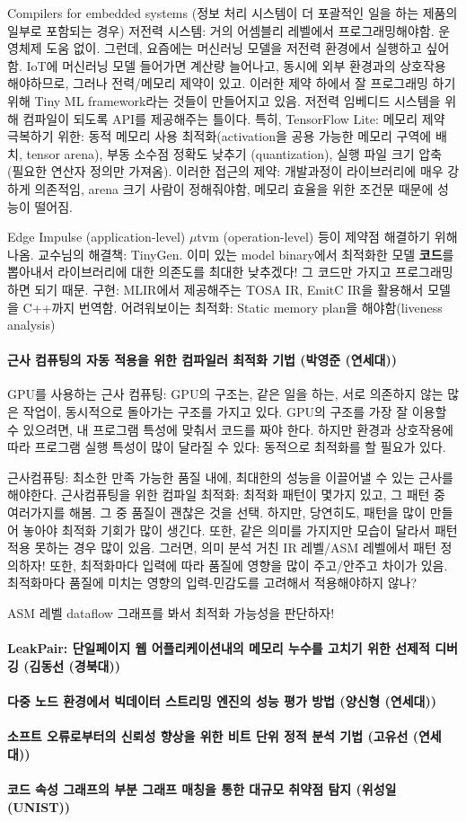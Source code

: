 \documentclass{article}
\begin{document}
Compilers for embedded systems (정보 처리 시스템이 더 포괄적인 일을 하는 제품의 일부로 포함되는 경우)
저전력 시스템: 거의 어셈블리 레벨에서 프로그래밍해야함. 운영체제 도움 없이.
그런데, 요즘에는 머신러닝 모델을 저전력 환경에서 실행하고 싶어함.
IoT에 머신러닝 모델 들어가면 계산량 늘어나고, 동시에 외부 환경과의 상호작용 해야하므로, 그러나 전력/메모리 제약이 있고.
이러한 제약 하에서 잘 프로그래밍 하기 위해 Tiny ML framework라는 것들이 만들어지고 있음.
저전력 임베디드 시스템을 위해 컴파일이 되도록 API를 제공해주는 틀이다.
특히, TensorFlow Lite: 메모리 제약 극복하기 위한: 동적 메모리 사용 최적화(activation을 공용 가능한 메모리 구역에 배치, tensor arena), 부동 소수점 정확도 낮추기 (quantization), 실행 파일 크기 압축 (필요한 연산자 정의만 가져옴).
이러한 접근의 제약: 개발과정이 라이브러리에 매우 강하게 의존적임, arena 크기 사람이 정해줘야함, 메모리 효율을 위한 조건문 때문에 성능이 떨어짐.

Edge Impulse (application-level) $\mu$tvm (operation-level) 등이 제약점 해결하기 위해 나옴.
교수님의 해결책: TinyGen. 이미 있는 model binary에서 최적화한 모델 \textbf{코드}를 뽑아내서 라이브러리에 대한 의존도를 최대한 낮추겠다!
그 코드만 가지고 프로그래밍하면 되기 때문.
구현: MLIR에서 제공해주는 TOSA IR, EmitC IR을 활용해서 모델을 C++까지 번역함.
어려워보이는 최적화: Static memory plan을 해야함(liveness analysis)
\paragraph{근사 컴퓨팅의 자동 적용을 위한 컴파일러 최적화 기법 (박영준 (연세대))}
GPU를 사용하는 근사 컴퓨팅: GPU의 구조는, 같은 일을 하는, 서로 의존하지 않는 많은 작업이, 동시적으로 돌아가는 구조를 가지고 있다.
GPU의 구조를 가장 잘 이용할 수 있으려면, 내 프로그램 특성에 맞춰서 코드를 짜야 한다.
하지만 환경과 상호작용에 따라 프로그램 실행 특성이 많이 달라질 수 있다: 동적으로 최적화를 할 필요가 있다.

근사컴퓨팅: 최소한 만족 가능한 품질 내에, 최대한의 성능을 이끌어낼 수 있는 근사를 해야한다.
근사컴퓨팅을 위한 컴파일 최적화: 최적화 패턴이 몇가지 있고, 그 패턴 중 여러가지를 해봄. 그 중 품질이 괜찮은 것을 선택.
하지만, 당연히도, 패턴을 많이 만들어 놓아야 최적화 기회가 많이 생긴다.
또한, 같은 의미를 가지지만 모습이 달라서 패턴 적용 못하는 경우 많이 있음. 그러면, 의미 분석 거친 IR 레벨/ASM 레벨에서 패턴 정의하자!
또한, 최적화마다 입력에 따라 품질에 영향을 많이 주고/안주고 차이가 있음. 최적화마다 품질에 미치는 영향의 입력-민감도를 고려해서 적용해야하지 않나?

ASM 레벨 dataflow 그래프를 봐서 최적화 가능성을 판단하자!
\paragraph{LeakPair: 단일페이지 웹 어플리케이션내의 메모리 누수를 고치기 위한 선제적 디버깅 (김동선 (경북대))}
\paragraph{다중 노드 환경에서 빅데이터 스트리밍 엔진의 성능 평가 방법 (양신형 (연세대))}
\paragraph{소프트 오류로부터의 신뢰성 향상을 위한 비트 단위 정적 분석 기법 (고유선 (연세대))}
\paragraph{코드 속성 그래프의 부분 그래프 매칭을 통한 대규모 취약점 탐지 (위성일 (UNIST))}
\end{document}
